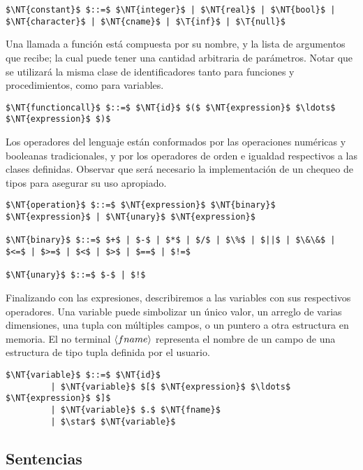 \begin{lstlisting}[style = syntax]
$\NT{constant}$ $::=$ $\NT{integer}$ | $\NT{real}$ | $\NT{bool}$ | $\NT{character}$ | $\NT{cname}$ | $\T{inf}$ | $\T{null}$
\end{lstlisting}

Una llamada a función está compuesta por su nombre, y la lista de argumentos que recibe; la cual puede tener una cantidad arbitraria de parámetros.
Notar que se utilizará la misma clase de identificadores tanto para funciones y procedimientos, como para variables.

\begin{lstlisting}[style = syntax]
$\NT{functioncall}$ $::=$ $\NT{id}$ $($ $\NT{expression}$ $\ldots$ $\NT{expression}$ $)$
\end{lstlisting}

Los operadores del lenguaje están conformados por las operaciones numéricas y booleanas tradicionales, y por los operadores de orden e igualdad respectivos a las clases definidas.
Observar que será necesario la implementación de un chequeo de tipos para asegurar su uso apropiado.

\begin{lstlisting}[style = syntax]
$\NT{operation}$ $::=$ $\NT{expression}$ $\NT{binary}$ $\NT{expression}$ | $\NT{unary}$ $\NT{expression}$

$\NT{binary}$ $::=$ $+$ | $-$ | $*$ | $/$ | $\%$ | $||$ | $\&\&$ | $<=$ | $>=$ | $<$ | $>$ | $==$ | $!=$

$\NT{unary}$ $::=$ $-$ | $!$
\end{lstlisting}

Finalizando con las expresiones, describiremos a las variables con sus respectivos operadores.
Una variable puede simbolizar un único valor, un arreglo de varias dimensiones, una tupla con múltiples campos, o un puntero a otra estructura en memoria.
El no terminal $\langle fname \rangle$ representa el nombre de un campo de una estructura de tipo tupla definida por el usuario.

\begin{lstlisting}[style = syntax]
$\NT{variable}$ $::=$ $\NT{id}$
         | $\NT{variable}$ $[$ $\NT{expression}$ $\ldots$ $\NT{expression}$ $]$
         | $\NT{variable}$ $.$ $\NT{fname}$
         | $\star$ $\NT{variable}$
\end{lstlisting}

\subsection{Sentencias}

